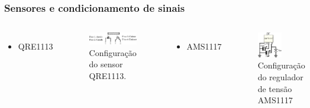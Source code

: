\begin{frame}
\frametitle{Sensores e condicionamento de sinais}
\begin{columns}

	\vspace{-1.5cm}
	\begin{itemize}
	\item QRE1113
	\end{itemize}
	\begin{figure}[th]
	\centering
	\captionsetup{width=\textwidth,font=footnotesize,textfont=bf}
	\includegraphics[width=\textwidth,keepaspectratio]{Figuras/qre.pdf}
	\caption{Configuração do sensor QRE1113.}
	\end{figure}


	\pause
	\begin{itemize}
	\item AMS1117
	\end{itemize}
	\begin{figure}[th]
	\centering
	\captionsetup{width=0.9\textwidth,font=footnotesize,textfont=bf}
	\includegraphics[width=0.5\textwidth,keepaspectratio]{Figuras/ams.pdf}
	\caption{Configuração do regulador de tensão AMS1117}
	\end{figure}

\end{columns}
\end{frame}

%
%
%


